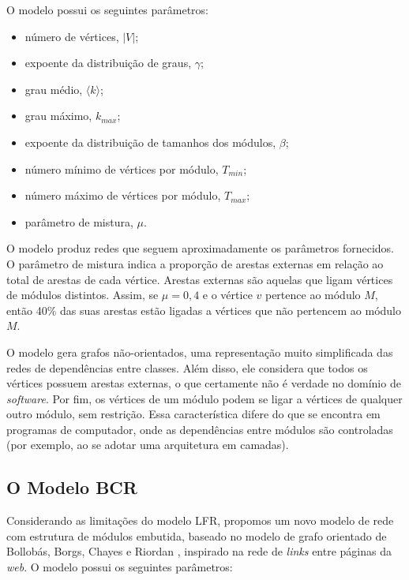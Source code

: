 \documentclass{acm_proc_article-sp}
\begin{document}
O modelo possui os seguintes parâmetros:
\begin{itemize}
  \item número de vértices, $|V|$;
  \item expoente da distribuição de graus, $\gamma$;
  \item grau médio, $\langle k \rangle$;
  \item grau máximo, $k_{max}$;
  \item expoente da distribuição de tamanhos dos módulos, $\beta$;
  \item número mínimo de vértices por módulo, $T_{min}$;
  \item número máximo de vértices por módulo, $T_{max}$;
  \item parâmetro de mistura, $\mu$.
\end{itemize}

O modelo produz redes que seguem aproximadamente os parâmetros fornecidos. O parâmetro de mistura indica a proporção de arestas externas em relação ao total de arestas de cada vértice. Arestas externas são aquelas que ligam vértices de módulos distintos. Assim, se $\mu = 0,4$ e o vértice $v$ pertence ao módulo $M$, então 40\% das suas arestas estão ligadas a vértices que não pertencem ao módulo $M$.


  O modelo gera grafos não-orientados, uma representação muito simplificada das redes de dependências entre classes. Além disso, ele considera que todos os vértices possuem arestas externas, o que certamente não é verdade no domínio de \emph{software}. Por fim, os vértices de um módulo podem se ligar a vértices de qualquer outro módulo, sem restrição. Essa característica difere do que se encontra em programas de computador, onde as dependências entre módulos são controladas (por exemplo, ao se adotar uma arquitetura em camadas).

\subsection{O Modelo BCR}

Considerando as limitações do modelo LFR, propomos um novo modelo de rede com estrutura de módulos embutida, baseado no modelo de grafo orientado de Bollobás, Borgs, Chayes e Riordan \cite{Bollobas2003}, inspirado na rede de \emph{links} entre páginas da \emph{web}. O modelo possui os seguintes parâmetros:
\end{document}
